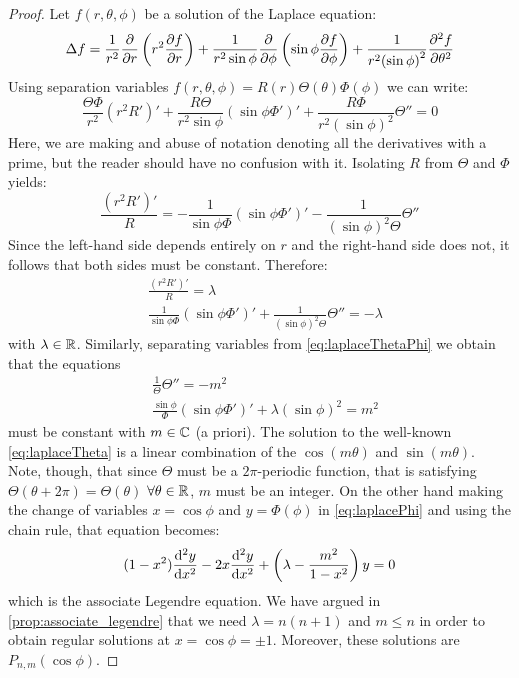 \documentclass[../main.tex]{subfiles}
\begin{document}
\begin{proof}
  Let $f(r,\theta,\phi)$ be a solution of the Laplace equation:
  \begin{equation}
    \Delta f = \frac{1}{r^2}\pdv{}{r}\left(r^2\pdv{f}{r}\right)+\frac{1}{r^2\sin\phi}\pdv{}{\phi}\left(\sin\phi\pdv{f}{\phi}\right)+\frac{1}{r^2{(\sin\phi)}^2}\pdv[2]{f}{\theta}
  \end{equation}
  Using separation variables $f(r,\theta,\phi)=R(r)\Theta(\theta)\Phi(\phi)$ we can write:
  \begin{equation}
    \frac{\Theta\Phi}{r^2}{(r^2R')}'+\frac{R\Theta}{r^2\sin\phi}{(\sin\phi\Phi')}'+\frac{R\Phi}{r^2{(\sin\phi)}^2}\Theta''=0
  \end{equation}
  Here, we are making and abuse of notation denoting all the derivatives with a prime, but the reader should have no confusion with it. Isolating $R$ from $\Theta$ and $\Phi$ yields:
  \begin{equation}
    \frac{{(r^2R')}'}{R}=-\frac{1}{\sin\phi\Phi}{(\sin\phi\Phi')}'-\frac{1}{{(\sin\phi)}^2\Theta}\Theta''
  \end{equation}
  Since the left-hand side depends entirely on $r$ and the right-hand side does not, it follows that both sides must be constant. Therefore:
  \begin{align}
    \label{eq:laplaceR}        & \frac{{(r^2R')}'}{R}=\lambda                                                               \\
    \label{eq:laplaceThetaPhi} & \frac{1}{\sin\phi\Phi}{(\sin\phi\Phi')}'+\frac{1}{{(\sin\phi)}^2\Theta}\Theta''  =-\lambda
  \end{align}
  with $\lambda\in\mathbb{R}$. Similarly, separating variables from \cref{eq:laplaceThetaPhi} we obtain that the equations
  \begin{align}
    \label{eq:laplaceTheta} & \frac{1}{\Theta}\Theta''  =-m^2                                     \\
    \label{eq:laplacePhi}   & \frac{\sin\phi}{\Phi}{(\sin\phi\Phi')}'+\lambda{(\sin\phi)}^2  =m^2
  \end{align}
  must be constant with $m\in\mathbb{C}$ (a priori). The solution to the well-known \cref{eq:laplaceTheta} is a linear combination of the $\cos(m\theta)$ and $\sin(m\theta)$. Note, though, that since $\Theta$ must be a $2\pi$-periodic function, that is satisfying $\Theta(\theta+2\pi)=\Theta(\theta)$ $\forall\theta\in\mathbb{R}$, $m$ must be an integer. On the other hand making the change of variables $x=\cos \phi$ and $y=\Phi(\phi)$ in \cref{eq:laplacePhi} and using the chain rule, that equation becomes:
  \begin{equation}\label{}
    (1-x^2)\dv[2]{y}{x}-2x\dv[2]{y}{x}+\left(\lambda-\frac{m^2}{1-x^2}\right)y=0
  \end{equation}
  which is the associate Legendre equation. We have argued in \cref{prop:associate_legendre} that we need $\lambda=n(n+1)$ and $m\leq n$ in order to obtain regular solutions at $x=\cos\phi=\pm 1$. Moreover, these solutions are $P_{n,m}(\cos\phi)$.


\end{proof}
\end{document}
